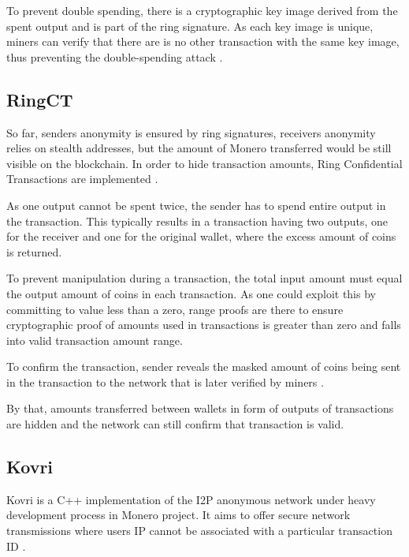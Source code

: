 \documentclass[
  printed, %
  table,   %
  nolof,     %
  nolot,     %
           oneside, color
]{fithesis3}
\begin{document}
To prevent double spending, there is a cryptographic key image derived from the spent output and is part of the ring signature. As each key image is unique, miners can verify that there are is no other transaction with the same key image, thus preventing the double-spending attack \cite{miller2017empirical}.


\subsection{RingCT}
So far, senders anonymity is ensured by ring signatures, receivers anonymity relies on stealth addresses, but the amount of Monero transferred would be still visible on the blockchain. In order to hide transaction amounts, Ring Confidential Transactions are implemented \cite{noether2015ring}.

As one output cannot be spent twice, the sender has to spend entire output in the transaction. This typically results in a transaction having two outputs, one for the receiver and one for the original wallet, where the excess amount of coins is returned.	 

To prevent manipulation during a transaction, the total input amount must equal the output amount of coins in each transaction. As one could exploit this by committing to value less than a zero, range proofs are there to ensure cryptographic proof of amounts used in transactions is greater than zero and falls into valid transaction amount range. 

To confirm the transaction, sender reveals the masked amount of coins being sent in the transaction to the network that is later verified by miners \cite{sun2017ringct}. 

By that, amounts transferred between wallets in form of outputs of transactions are hidden and the network can still confirm that transaction is valid.

\subsection{Kovri}
Kovri is a C++ implementation of the I2P anonymous network under heavy development process in Monero project. It aims to offer secure network transmissions where users IP cannot be associated with a particular transaction ID \cite{monerokovri}. 
\end{document}

